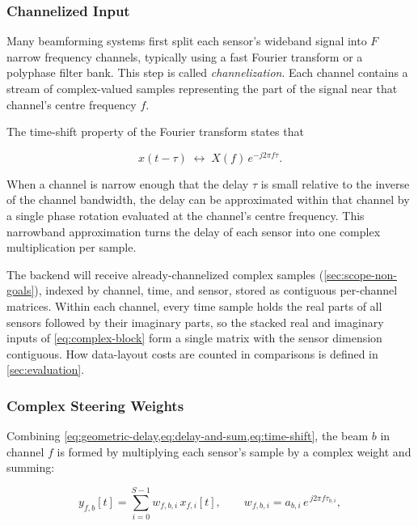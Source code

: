 \subsubsection{Channelized Input}
\label{sec:channelized-input}

Many beamforming systems first split each sensor's wideband signal into $F$ narrow frequency channels, typically using a fast Fourier transform or a polyphase filter bank. This step is called \emph{channelization}. Each channel contains a stream of complex-valued samples representing the part of the signal near that channel's centre frequency $f$.

The time-shift property of the Fourier transform states that

\begin{equation}
  x(t - \tau) \;\longleftrightarrow\; X(f)\, e^{-j 2\pi f \tau}.
  \label{eq:time-shift}
\end{equation}

When a channel is narrow enough that the delay $\tau$ is small relative to the inverse of the channel bandwidth, the delay can be approximated within that channel by a single phase rotation evaluated at the channel's centre frequency. This narrowband approximation turns the delay of each sensor into one complex multiplication per sample.

The backend will receive already-channelized complex samples (\cref{sec:scope-non-goals}), indexed by channel, time, and sensor, stored as contiguous per-channel matrices. Within each channel, every time sample holds the real parts of all sensors followed by their imaginary parts, so the stacked real and imaginary inputs of \cref{eq:complex-block} form a single matrix with the sensor dimension contiguous. How data-layout costs are counted in comparisons is defined in \cref{sec:evaluation}.

\subsubsection{Complex Steering Weights}
\label{sec:complex-steering-weights}

Combining \cref{eq:geometric-delay,eq:delay-and-sum,eq:time-shift}, the beam $b$ in channel $f$ is formed by multiplying each sensor's sample by a complex weight and summing:

\begin{equation}
  y_{f,b}[t] = \sum_{i=0}^{S-1} w_{f,b,i} \, x_{f,i}[t],
  \qquad
  w_{f,b,i} = a_{b,i} \, e^{\,j 2\pi f \tau_{b,i}},
  \label{eq:steering-weights}
\end{equation}

